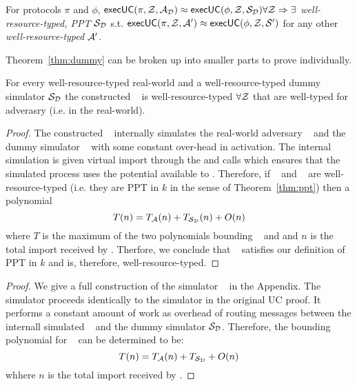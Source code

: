 \begin{theorem}\label{thm:dummy}
For protocols $\pi$ and $\phi$, ${\mathsf {execUC}}(\pi, \mathcal{Z}, \mathcal{A}_\mathcal{D}) \approx {\mathsf {execUC}}(\phi, \mathcal{Z}, \mathcal{S}_{\mathcal{D}}) \forall \mathcal{Z} \Rightarrow \exists$ \textit{well-resource-typed, PPT} $\mathcal{S}_{\mathcal{D}}$ s.t. ${\mathsf {execUC}}(\pi, \mathcal{Z}, \mathcal{A}') \approx {\mathsf {execUC}}(\phi, \mathcal{Z}, \mathcal{S}')$ for any other \textit{well-resource-typed} $\mathcal{A}'$.
\end{theorem}

Theorem~\ref{thm:dummy} can be broken up into smaller parts to prove individually.

\begin{lemma}\label{lem:dummyppt}
For every well-resource-typed real-world \Adversary and a well-resource-typed dummy simulator $\mathcal{S}_{\mathcal{D}}$ the constructed \Simulator~ is well-resource-typed $\forall \mathcal{Z}$ that are well-typed for adverasry \Adversary (i.e. in the real-world).
\end{lemma}

\begin{proof}
The constructed \Simulator~ internally simulates the real-world adversary \Adversary~ and the dummy simulator \Dummysim~ with some constant over-head in activation. 
The internal simulation is given virtual import through the  and  calls which ensures that the simulated process uses the potential available to \Simulator.
Therefore, if \Adversary~ and \Simulator~ are well-resource-typed (i.e. they are PPT in $k$ in the sense of Theorem~\ref{thm:ppt}) then a polynomial
$$ T(n) = T_{\mathcal{A}}(n) + T_{\mathcal{S}_{\mathcal{D}}}(n) + O(n) $$
where $T$ is the maximum of the two polynomials bounding \Adversary~ and \Dummysim and $n$ is the total import received by \Simulator. 
Therfore, we conclude that \Simulator~ satisfies our definition of PPT in $k$ and is, therefore, well-resource-typed.
\end{proof}

\begin{proof}
We give a full construction of the simulator \Simulator~ in the Appendix.
The simulator proceeds identically to the simulator in the original UC proof. It performs a constant amount of work as overhead of routing messages between the internall simulated \Adversary~ and the dummy simulator $\mathcal{S}_{\mathcal{D}}$. 
Therefore, the bounding polynomial for \Simulator~ can be determined to be:
$$ T(n) = T_{\mathcal{A}}(n) + T_{\mathcal{S}_{\mathcal{D}}} + O(n)$$ 
whhere $n$ is the total import received by \Simulator.
\end{proof}

